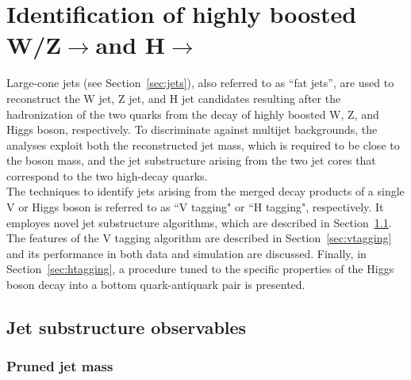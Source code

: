 \chapter{Identification of highly boosted W/Z$\rightarrow$\qqbarpr and H$\rightarrow$\bbbar}
\label{ch:vtagging}


Large-cone jets (see Section~\ref{sec:jets}), also referred to as ``fat jets'', are used to reconstruct the W jet, Z jet, and H jet candidates resulting after the hadronization of the two quarks from the decay of highly boosted W, Z, and Higgs boson, respectively. To discriminate against multijet backgrounds, the analyses exploit both the reconstructed jet mass, which is required to be close to the boson mass, and the jet substructure arising from the two jet cores that correspond to the two high-\pt decay quarks.\\

The techniques to identify jets arising from the merged decay products of a single V or Higgs boson is referred to as ``V tagging" or ``H tagging", respectively. It employes novel jet substructure algorithms, which are described in Section~\ref{sec:jetsubalgo}. The features of the V tagging algorithm are described in Section~\ref{sec:vtagging} and its performance in both data and simulation are discussed. 
Finally, in Section~\ref{sec:htagging}, a procedure tuned to the specific properties of the Higgs boson decay into a bottom quark-antiquark pair is presented.

\section{Jet substructure observables}
\label{sec:jetsubalgo}

\subsection{Pruned jet mass}
\label{subsec:pruning}

